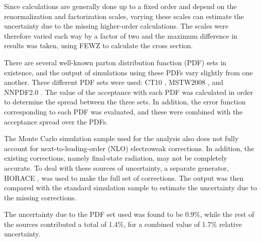 
Since calculations are generally done up to a fixed order 
and depend on the renormalization and factorization scales, %
varying these scales can estimate the uncertainty due 
to the missing higher-order calculations.  
The scales were therefore varied each way by a factor of two 
and the maximum difference in results was taken, 
using FEWZ to calculate the cross section.  %



There are several well-known
parton distribution function (PDF) sets
in existence,
and the output of simulations
using these PDFs vary slightly from one another.
Three different PDF sets were used: 
CT10 \cite{CT10}, MSTW2008 \cite{MSTW}, and NNPDF2.0 \cite{NNPDF}.  
The value of the acceptance with each PDF was calculated 
in order to determine the spread between the three sets.  
In addition, the error function corresponding to each PDF 
was evaluated, 
and these were combined with the acceptance spread 
over the PDFs.  



The Monte Carlo simulation sample used for the analysis 
also does not fully account for next-to-leading-order (NLO) 
electroweak corrections.  
In addition, the existing corrections, 
namely final-state radiation, 
may not be completely accurate.  
To deal with these sources of uncertainty, 
a separate generator, HORACE \cite{horace1} \cite{horace2}, 
was used to make the full set of corrections.  
The output was then compared with the 
standard simulation sample to estimate 
the uncertainty due to the missing corrections.  



The uncertainty due to the PDF set used 
was found to be 0.9\%, 
while the rest of the sources 
contributed a total of 1.4\%, 
for a combined value of 1.7\% relative uncertainty.  





